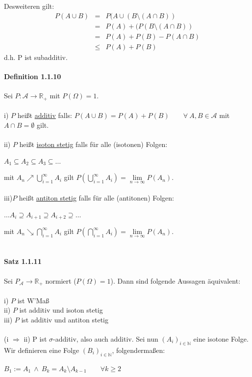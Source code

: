 \documentclass[10pt,a4paper]{report}
\numberwithin{equation}{section}
\numberwithin{figure}{section}
\theoremstyle{plain}
\theoremstyle{definition}
\theoremstyle{plain}
\theoremstyle{definition}
\theoremstyle{remark}
\theoremstyle{plain}
\begin{document}
Desweiteren gilt:
\begin{eqnarray*}
P(A\cup B)&=&P(A\cup(B\setminus (A\cap B))\\
&=&P(A)+(P(B\setminus(A \cap B))\\
&=& P(A)+P(B)-P(A\cap B)\\ 
&\leq& P(A)+P(B)
\end{eqnarray*}
d.h. P ist subadditiv.\\\\
\textbf{Definition 1.1.10}\\\\
Sei $P:\mathcal{A} \to \mathbb{R}_+$ mit $P(\Omega)=1$.\\\\
i) $P$ heißt \underline{additiv} falls: $P(A\cup B)=P(A)+P(B) \qquad \forall~ A,B\in\mathcal{A} $ mit $A\cap B =\emptyset$ gilt. \\\\
ii) $P$ heißt \underline{isoton stetig} falls für alle (isotonen) Folgen:
\begin{center}
$A_1 \subseteq A_2 \subseteq A_3 \subseteq \dots$
\end{center}
mit $A_n \nearrow \bigcup\limits_{i=1}^\infty A_i$ gilt $P\left(\bigcup\limits_{i=1}^\infty A_i\right)=\lim\limits_{n \to \infty}P(A_n)$.\\\\
iii)$P$ heißt \underline{antiton stetig} falls für alle (antitonen) Folgen:
\begin{center}
$\dots A_i \supseteq A_{i+1} \supseteq A_{i+2} \supseteq \dots$
\end{center}
mit $A_n \searrow \bigcap\limits_{i=1}^\infty A_i$ gilt $P\left(\bigcap\limits_{i=1}^\infty A_i\right)=\lim\limits_{n \to \infty}P(A_n)$.\\\\\\
\textbf{Satz 1.1.11}\\\\
Sei $P_\mathcal{A}\to \mathbb{R}_+$ normiert ($P(\Omega)=1$). Dann sind folgende Aussagen äquivalent:\\\\
i) $P$ ist W'Maß\\
ii) $P$ ist additiv und isoton stetig\\
iii) $P$ ist additiv und antiton stetig\\
\proof $ $\\
(i $\Rightarrow$ ii) P ist $\sigma$-additiv, also auch additiv. Sei nun $(A_i)_{i \in \mathbb{N}}$ eine isotone Folge. Wir definieren eine Folge $(B_i)_{i \in \mathbb{N}}$, folgendermaßen:\begin{center}
$B_1:=A_1 ~\wedge~ B_k=A_k\setminus A_{k-1} \qquad \forall k \geq 2 $
\end{center} 
\end{document}

